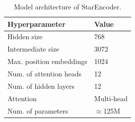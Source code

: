 \documentclass[10pt]{article} %
\begin{document}






\begin{table}[t]
\centering
\begin{tabular}{ll}
\toprule
\textbf{Hyperparameter} & \textbf{Value}\\
\midrule
Hidden size              & 768             \\
Intermediate size        & 3072            \\
Max. position embeddings & 1024            \\
Num. of attention heads  & 12              \\
Num. of hidden layers    & 12              \\ 
Attention & Multi-head\\
\midrule
Num. of parameters      & $\approx$125M \\ \bottomrule
\end{tabular}
\caption{Model architecture of StarEncoder.}\label{tab:encoder_arch}
\end{table}
\end{document}
